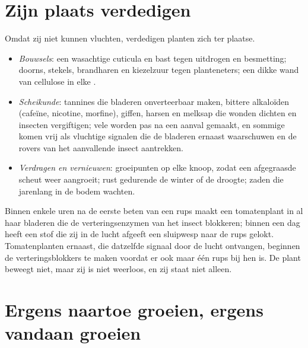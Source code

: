 \section{Zijn plaats verdedigen}

\begin{proposition}\label{prop:g12:plant-rooted-life:defences}
Omdat zij niet kunnen vluchten, verdedigen planten zich ter plaatse.
\begin{itemize}
  \item \emph{Bouwsels}: een wasachtige cuticula en bast tegen uitdrogen
        en besmetting; doorns, stekels, brandharen en kiezelzuur tegen
        planteneters; een dikke wand van cellulose in elke .
  \item \emph{Scheikunde}: tannines die bladeren onverteerbaar maken,
        bittere alkaloïden (cafeïne, nicotine, morfine), giffen, harsen
        en melksap die wonden dichten en insecten vergiftigen; vele
        worden pas na een aanval gemaakt, en sommige komen vrij als
        vluchtige signalen die de bladeren ernaast waarschuwen en de
        rovers van het aanvallende insect aantrekken.
  \item \emph{Verdragen en vernieuwen}: groeipunten op elke knoop, zodat
        een afgegraasde scheut weer aangroeit; rust gedurende de winter
        of de droogte; zaden die jarenlang in de bodem wachten.
\end{itemize}
\end{proposition}
\admitted

\begin{example}\label{ex:g12:plant-rooted-life:caterpillar}
Binnen enkele uren na de eerste beten van een rups maakt een tomatenplant
in al haar bladeren  die de verteringsenzymen van het insect
blokkeren; binnen een dag heeft een stof die zij in de lucht afgeeft een
sluipwesp naar de rups gelokt. Tomatenplanten ernaast, die datzelfde
signaal door de lucht ontvangen, beginnen de verteringsblokkers te maken
voordat er ook maar één rups bij hen is. De plant beweegt niet, maar zij
is niet weerloos, en zij staat niet alleen.
\end{example}

\section{Ergens naartoe groeien, ergens vandaan groeien}

